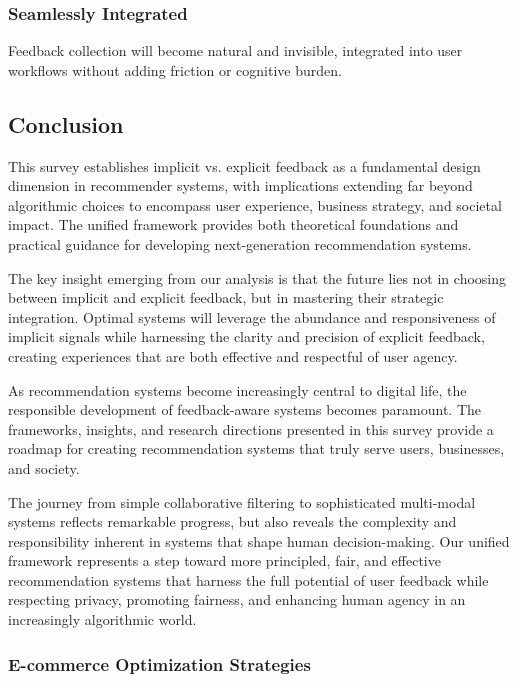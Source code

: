 \subsubsection{Seamlessly Integrated}
Feedback collection will become natural and invisible, integrated into user workflows without adding friction or cognitive burden.

\subsection{Conclusion}

This survey establishes implicit vs. explicit feedback as a fundamental design dimension in recommender systems, with implications extending far beyond algorithmic choices to encompass user experience, business strategy, and societal impact. The unified framework provides both theoretical foundations and practical guidance for developing next-generation recommendation systems.

The key insight emerging from our analysis is that the future lies not in choosing between implicit and explicit feedback, but in mastering their strategic integration. Optimal systems will leverage the abundance and responsiveness of implicit signals while harnessing the clarity and precision of explicit feedback, creating experiences that are both effective and respectful of user agency.

As recommendation systems become increasingly central to digital life, the responsible development of feedback-aware systems becomes paramount. The frameworks, insights, and research directions presented in this survey provide a roadmap for creating recommendation systems that truly serve users, businesses, and society.

The journey from simple collaborative filtering to sophisticated multi-modal systems reflects remarkable progress, but also reveals the complexity and responsibility inherent in systems that shape human decision-making. Our unified framework represents a step toward more principled, fair, and effective recommendation systems that harness the full potential of user feedback while respecting privacy, promoting fairness, and enhancing human agency in an increasingly algorithmic world.

\subsubsection{E-commerce Optimization Strategies}

